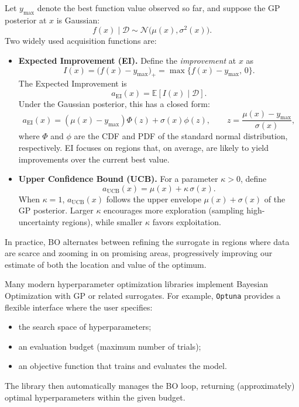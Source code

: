 \documentclass[../main]{subfiles}
\begin{document}
Let $y_{\max}$ denote the best function value observed so far, and suppose the
GP posterior at $x$ is Gaussian:
\begin{equation}
    f(x)\mid \mathcal{D}
    \sim \mathcal{N}\bigl(\mu(x), \sigma^2(x)\bigr).
\end{equation}
Two widely used acquisition functions are:
\begin{itemize}
    \item \textbf{Expected Improvement (EI).}
    Define the \emph{improvement} at $x$ as
    \begin{equation}
        I(x) = \bigl(f(x) - y_{\max}\bigr)_+
        = \max\{f(x)-y_{\max},\,0\}.
    \end{equation}
    The Expected Improvement is
    \begin{equation}
        a_{\mathrm{EI}}(x)
        = \mathbb{E}[I(x)\mid\mathcal{D}].
    \end{equation}
    Under the Gaussian posterior, this has a closed form:
    \begin{equation}
        a_{\mathrm{EI}}(x)
        = (\mu(x)-y_{\max})\Phi(z) + \sigma(x)\phi(z),
        \qquad
        z = \frac{\mu(x)-y_{\max}}{\sigma(x)},
    \end{equation}
    where $\Phi$ and $\phi$ are the CDF and PDF of the standard normal
    distribution, respectively.  EI focuses on regions that, on average, are
    likely to yield improvements over the current best value.

    \item \textbf{Upper Confidence Bound (UCB).}
    For a parameter $\kappa>0$, define
    \begin{equation}
        a_{\mathrm{UCB}}(x)
        = \mu(x) + \kappa\,\sigma(x).
    \end{equation}
    When $\kappa=1$, $a_{\mathrm{UCB}}(x)$ follows the upper envelope
    $\mu(x)+\sigma(x)$ of the GP posterior.  Larger $\kappa$ encourages more
    exploration (sampling high-uncertainty regions), while smaller $\kappa$
    favors exploitation.
\end{itemize}
In practice, BO alternates between refining the surrogate in regions where data
are scarce and zooming in on promising areas, progressively improving our
estimate of both the location and value of the optimum.

\begin{remark}
    Many modern hyperparameter optimization libraries implement Bayesian
    Optimization with GP or related surrogates.  For example, \texttt{Optuna}
    provides a flexible interface where the user specifies:
    \begin{itemize}
        \item the search space of hyperparameters;
        \item an evaluation budget (maximum number of trials);
        \item an objective function that trains and evaluates the model.
    \end{itemize}
    The library then automatically manages the BO loop, returning (approximately)
    optimal hyperparameters within the given budget.
\end{remark}
\end{document}

